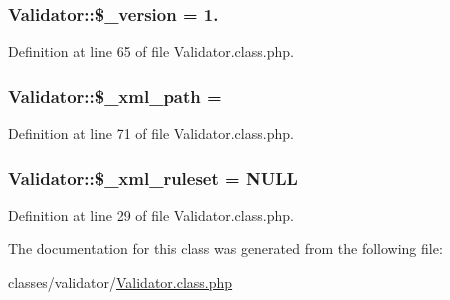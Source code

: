 \subsubsection[{\texorpdfstring{\$\+\_\+version}{$_version}}]{\setlength{\rightskip}{0pt plus 5cm}Validator\+::\$\+\_\+version = \textquotesingle{}1.\textquotesingle{}}\hypertarget{classValidator_af3e80f6437543d50f58f1e5269900068}{}\label{classValidator_af3e80f6437543d50f58f1e5269900068}


Definition at line 65 of file Validator.\+class.\+php.

\subsubsection[{\texorpdfstring{\$\+\_\+xml\+\_\+path}{$_xml_path}}]{\setlength{\rightskip}{0pt plus 5cm}Validator\+::\$\+\_\+xml\+\_\+path = \textquotesingle{}\textquotesingle{}}\hypertarget{classValidator_a69a5bdd50a59f7d9daab2ea702036277}{}\label{classValidator_a69a5bdd50a59f7d9daab2ea702036277}


Definition at line 71 of file Validator.\+class.\+php.

\subsubsection[{\texorpdfstring{\$\+\_\+xml\+\_\+ruleset}{$_xml_ruleset}}]{\setlength{\rightskip}{0pt plus 5cm}Validator\+::\$\+\_\+xml\+\_\+ruleset = N\+U\+LL}\hypertarget{classValidator_a45a0aaa905493683be7fc01a80837a26}{}\label{classValidator_a45a0aaa905493683be7fc01a80837a26}


Definition at line 29 of file Validator.\+class.\+php.



The documentation for this class was generated from the following file\+:\begin{DoxyCompactItemize}
\item 
classes/validator/\hyperlink{Validator_8class_8php}{Validator.\+class.\+php}\end{DoxyCompactItemize}
